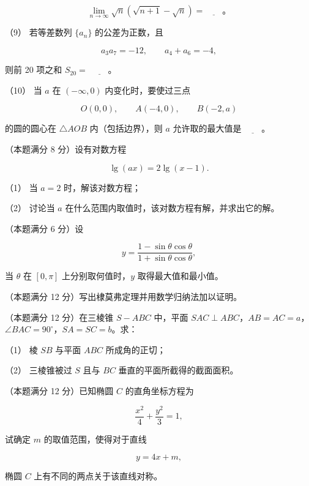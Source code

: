\begin{question}
\nopagebreak[4]
\[
\lim_{n\to\infty}\sqrt n\left(\sqrt{n+1}-\sqrt n\right)
=\underline{\hspace{2em}}\text{。}
\]

（9） 若等差数列 $\{a_n\}$ 的公差为正数，且

\nopagebreak[4]
\[
a_3a_7=-12,\qquad a_4+a_6=-4,
\]

则前 20 项之和 $S_{20}=$ $\underline{\hspace{2em}}$。

（10） 当 $a$ 在 $(-\infty,0)$ 内变化时，要使过三点

\nopagebreak[4]
\[
O(0,0),\qquad A(-4,0),\qquad B(-2,a)
\]

的圆的圆心在 $\triangle AOB$ 内（包括边界），则 $a$ 允许取的最大值是 $\underline{\hspace{2em}}$。

\end{question}
\begin{question}
（本题满分 8 分）设有对数方程

\nopagebreak[4]
\[
\lg(ax)=2\lg(x-1).
\]

（1） 当 $a=2$ 时，解该对数方程；

（2） 讨论当 $a$ 在什么范围内取值时，该对数方程有解，并求出它的解。

\end{question}
\begin{question}
（本题满分 6 分）设

\nopagebreak[4]
\[
y=\frac{1-\sin\theta\cos\theta}
{1+\sin\theta\cos\theta},
\]

当 $\theta$ 在 $[0,\pi]$ 上分别取何值时，$y$ 取得最大值和最小值。

\end{question}
\begin{question}
（本题满分 12 分）写出棣莫弗定理并用数学归纳法加以证明。

\Needspace{0.4\textheight}
\end{question}
\begin{question}
（本题满分 12 分）在三棱锥 $S-ABC$ 中，平面 $SAC\perp ABC$，$AB=AC=a$，$\angle BAC=90^\circ$，$SA=SC=b$。求：

（1） 棱 $SB$ 与平面 $ABC$ 所成角的正切；

（2） 三棱锥被过 $S$ 且与 $BC$ 垂直的平面所截得的截面面积。
\nopagebreak[4]
\begin{center}\end{center}
\nopagebreak[4]
\end{question}
\begin{question}
（本题满分 12 分）已知椭圆 $C$ 的直角坐标方程为

\nopagebreak[4]
\[
\frac{x^2}{4}+\frac{y^2}{3}=1,
\]

试确定 $m$ 的取值范围，使得对于直线

\nopagebreak[4]
\[
y=4x+m,
\]

椭圆 $C$ 上有不同的两点关于该直线对称。

\end{question}